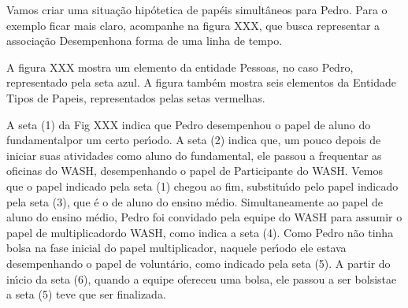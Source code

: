 \documentclass[
12pt,		%
openright,	%
twoside,  %
a4paper,			%
chapter=TITLE,		%
english,			%
french,				%
spanish,			%
brazil				%
]{USPSC-classe/USPSC}
\begin{document}
Vamos criar uma situa\c{c}\~ao hip\'otetica de pap\'eis simult\^aneos para Pedro. Para o exemplo ficar mais claro, acompanhe na figura XXX, que busca representar a associa\c{c}\~ao \textquotedbl Desempenho\textquotedbl  na forma de uma linha de tempo.









A figura XXX mostra um elemento da entidade \textquotedbl Pessoas\textquotedbl , no caso \textquotedbl Pedro\textquotedbl , representado pela seta azul. A figura tamb\'em mostra seis elementos da Entidade \textquotedbl Tipos de Papeis\textquotedbl , representados pelas setas vermelhas.









A seta (1) da Fig XXX indica que Pedro desempenhou o papel de \textquotedbl aluno do fundamental\textquotedbl  por um certo per\'{\i}odo. A seta (2) indica que, um pouco depois de iniciar suas atividades como \textquotedbl aluno do fundamental\textquotedbl , ele passou a frequentar as oficinas do WASH, desempenhando o papel de \textquotedbl Participante do WASH\textquotedbl . Vemos que o papel indicado pela seta (1) chegou ao fim, substitu\'{\i}do pelo papel indicado pela seta (3), que \'e o de \textquotedbl aluno do ensino m\'edio\textquotedbl . Simultaneamente ao papel de \textquotedbl aluno do ensino m\'edio\textquotedbl , Pedro foi convidado pela equipe do WASH para assumir o papel de \textquotedbl multiplicador\textquotedbl  do WASH, como indica a seta (4). Como Pedro n\~ao tinha bolsa na fase inicial do papel \textquotedbl multiplicador\textquotedbl , naquele per\'{\i}odo ele estava desempenhando o papel de \textquotedbl volunt\'ario\textquotedbl , como indicado pela seta (5). A partir do in\'{\i}cio da seta (6), quando a equipe ofereceu uma bolsa, ele passou a ser \textquotedbl bolsista\textquotedbl  e a seta (5) teve que ser finalizada.
\end{document}
